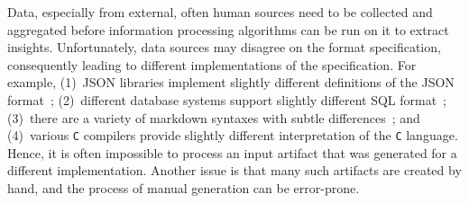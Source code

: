 \documentclass[sigconf,review,anonymous]{acmart}
\def\<#1>{\texttt{#1}}
\newcounter{todocounter}
\newcommand{\todo}[1]{\marginpar{$|$}\textcolor{red}{\stepcounter{todocounter}\footnote[\thetodocounter]{\textcolor{red}{\textbf{TODO }}\textit{#1}}}}
\newcommand{\recheck}[1]{\textcolor{red}{#1}}
\renewcommand{\todo}[1]{}
\newcommand{\approach}{\textsc{FSynth}\xspace}
\begin{document}
\todo{remember to say the meaning or derivation of the name \approach}
Data, especially from external, often human sources need to be collected and
aggregated before information processing algorithms can be run on it to extract
insights. \todo{add concrete example use case} Unfortunately, data sources may disagree on the format specification, %
consequently leading to different %
implementations of the specification. %
For example, (1)~JSON libraries implement slightly different
definitions of the JSON format~\cite{harrand2021behavioral,seriot2016parsing};
(2)~different database systems support %
slightly different SQL format~\cite{arvin2018comparison}; (3)~there are a variety of markdown
syntaxes with subtle differences~\cite{visnoviz2019comparison}; and (4)~various
\<C> compilers %
provide slightly different interpretation of the \<C> language.
Hence, it is often impossible to process an input artifact that was generated for
a different implementation. %
Another issue is that many such artifacts
are created by hand, and the process of manual generation can be error-prone.
\end{document}

